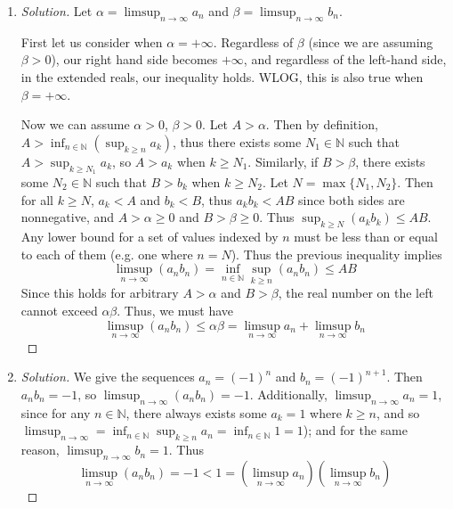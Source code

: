 \documentclass{article}
\newcommand{\N}{{\mathbb N}}
\begin{document}
\begin{enumerate}
	\item \begin{proof}[Solution]\let\qed\relax
		Let $\alpha = \limsup_{n\to\infty} a_n$ and $\beta = \limsup_{n\to\infty}b_n$.

		First let us consider when $\alpha = +\infty$.
		Regardless of $\beta$ (since we are assuming $\beta > 0$),
		our right hand side becomes $+\infty$,
		and regardless of the left-hand side,
		in the extended reals, our inequality holds.
		WLOG, this is also true when $\beta = +\infty$.

		Now we can assume $\alpha > 0$, $\beta > 0$.
		Let $A > \alpha$.
		Then by definition, $A > \inf_{n \in \N}\left(\sup_{k\geq n} a_k\right)$,
		thus there exists some $N_1 \in \N$ such that $A > \sup_{k \geq N_1} a_k$,
		so $A > a_k$ when $k \geq N_1$.
		Similarly, if $B > \beta$,
		there exists some $N_2 \in \N$ such that $B > b_k$ when $k \geq N_2$.
		Let $N = \max\{N_1,N_2\}$.
		Then for all $k \geq N$,
		$a_k < A$ and $b_k < B$,
		thus $a_kb_k < AB$
		since both sides are nonnegative, and $A>\alpha\geq0$ and $B>\beta\geq0$.
		Thus $\sup_{k \geq N} (a_kb_k) \leq AB$.
		Any lower bound for a set of values indexed by $n$
		must be less than or equal to each of them
		(e.g. one where $n = N$).
		Thus the previous inequality implies
		\[
			\limsup_{n\to\infty}(a_nb_n) = \inf_{n\in\N}\sup_{k\geq n}(a_nb_n)
			\leq AB
		\]
		Since this holds for arbitrary $A > \alpha$ and $B > \beta$,
		the real number on the left cannot exceed $\alpha \beta$.
		Thus, we must have
		\[
			\limsup_{n\to\infty}(a_nb_n) \leq \alpha\beta = \limsup_{n\to\infty} a_n + \limsup_{n\to\infty} b_n
		\]
	\end{proof}
	\item \begin{proof}[Solution]\let\qed\relax
		We give the sequences $a_n = (-1)^n$ and $b_n = (-1)^{n+1}$.
		Then $a_nb_n = -1$,
		so $\limsup_{n\to\infty}(a_nb_n) = -1$.
		Additionally, $\limsup_{n\to\infty} a_n = 1$,
		since for any $n \in \N$,
		there always exists some $a_k = 1$ where $k \geq n$,
		and so $\limsup_{n\to\infty} = \inf_{n\in\N} \sup_{k \geq n} a_n
		= \inf_{n\in\N} 1 = 1$);
		and for the same reason, $\limsup_{n\to\infty} b_n = 1$.
		Thus
		\[
			\limsup_{n\to\infty} (a_nb_n) = -1 < 1 =
			\left(\limsup_{n\to\infty} a_n\right)\left(\limsup_{n\to\infty}b_n\right)
		\]
	\end{proof}
\end{enumerate}
\clearpage
~\clearpage
\end{document}
